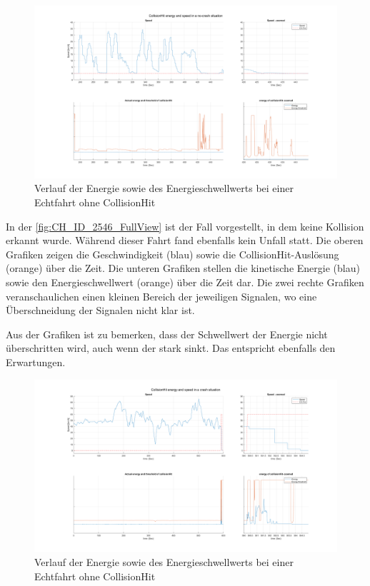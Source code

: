 \begin{figure}[H] %
	\centering
	\includegraphics[width=\linewidth]{Bilder/CH1_speed_CHEnergy.png}
	\caption{Verlauf der Energie sowie des Energieschwellwerts bei einer Echtfahrt ohne CollisionHit}
	\label{fig:CH_ID_2546_FullView}
\end{figure}

In der \autoref{fig:CH_ID_2546_FullView} ist der Fall vorgestellt, in dem keine Kollision erkannt wurde. Während dieser Fahrt fand ebenfalls kein Unfall statt. 
Die oberen Grafiken zeigen die Geschwindigkeit (blau) sowie die CollisionHit-Auslösung (orange) über die Zeit.
Die unteren Grafiken stellen die kinetische Energie (blau) sowie den Energieschwellwert (orange) über die Zeit dar.
Die zwei rechte Grafiken veranschaulichen einen kleinen Bereich der jeweiligen Signalen, wo eine Überschneidung der Signalen nicht klar ist.

Aus der Grafiken ist zu bemerken, dass der Schwellwert der Energie nicht überschritten wird, auch wenn der stark sinkt. Das entspricht ebenfalls den Erwartungen.

\begin{figure}[H]
	\centering
	\includegraphics[width=\linewidth]{Bilder/CH2_speed_CHEnergy.png}
	\caption{Verlauf der Energie sowie des Energieschwellwerts bei einer Echtfahrt ohne CollisionHit} %
	\label{fig:CH_ID_2546_zoom}
\end{figure}

